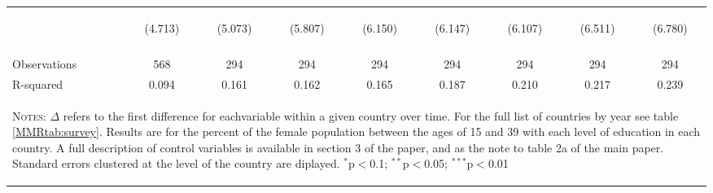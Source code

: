 \begin{landscape}
\begin{table}[htpb!]
\begin{center}
\begin{tabular}{lcccccccc}
&\begin{footnotesize}(4.713)\end{footnotesize}&\begin{footnotesize}(5.073)\end{footnotesize}&\begin{footnotesize}(5.807)\end{footnotesize}&\begin{footnotesize}(6.150)\end{footnotesize}&\begin{footnotesize}(6.147)\end{footnotesize}&\begin{footnotesize}(6.107)\end{footnotesize}&\begin{footnotesize}(6.511)\end{footnotesize}&\begin{footnotesize}(6.780)\end{footnotesize}\\
&&&&&&&&\\
Observations&568&294&294&294&294&294&294&294\\
R-squared&0.094&0.161&0.162&0.165&0.187&0.210&0.217&0.239\\
\midrule
\multicolumn{9}{p{20cm}}{\begin{footnotesize}\textsc{Notes:} $\Delta$ refers to the first difference for eachvariable within a given country over time. For the full list of countries by year see table \ref{MMRtab:survey}.  Results are for the percent of the female population between the ages of  15 and 39 with each level of education in each country.  A full description of control variables is available in section 3 of the paper, and as the note to table 2a of the main paper.  Standard errors clustered at the level of the country are diplayed.
$^{*}$p$<$0.1; $^{**}$p$<$0.05; $^{***}$p$<$0.01\end{footnotesize}} \\ \bottomrule 
\end{tabular}\end{center}\end{table}\end{landscape}
